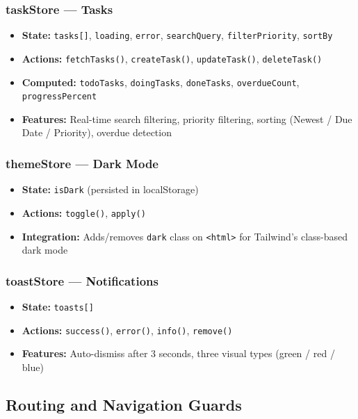 \documentclass[12pt, a4paper]{article}
\begin{document}
\subsubsection{taskStore --- Tasks}
\begin{itemize}[nosep]
    \item \textbf{State:} \texttt{tasks[]}, \texttt{loading}, \texttt{error}, \texttt{searchQuery}, \texttt{filterPriority}, \texttt{sortBy}
    \item \textbf{Actions:} \texttt{fetchTasks()}, \texttt{createTask()}, \texttt{updateTask()}, \texttt{deleteTask()}
    \item \textbf{Computed:} \texttt{todoTasks}, \texttt{doingTasks}, \texttt{doneTasks}, \texttt{overdueCount}, \texttt{progressPercent}
    \item \textbf{Features:} Real-time search filtering, priority filtering, sorting (Newest / Due Date / Priority), overdue detection
\end{itemize}

\subsubsection{themeStore --- Dark Mode}
\begin{itemize}[nosep]
    \item \textbf{State:} \texttt{isDark} (persisted in localStorage)
    \item \textbf{Actions:} \texttt{toggle()}, \texttt{apply()}
    \item \textbf{Integration:} Adds/removes \texttt{dark} class on \texttt{<html>} for Tailwind's class-based dark mode
\end{itemize}

\subsubsection{toastStore --- Notifications}
\begin{itemize}[nosep]
    \item \textbf{State:} \texttt{toasts[]}
    \item \textbf{Actions:} \texttt{success()}, \texttt{error()}, \texttt{info()}, \texttt{remove()}
    \item \textbf{Features:} Auto-dismiss after 3 seconds, three visual types (green / red / blue)
\end{itemize}

\subsection{Routing and Navigation Guards}
\end{document}
